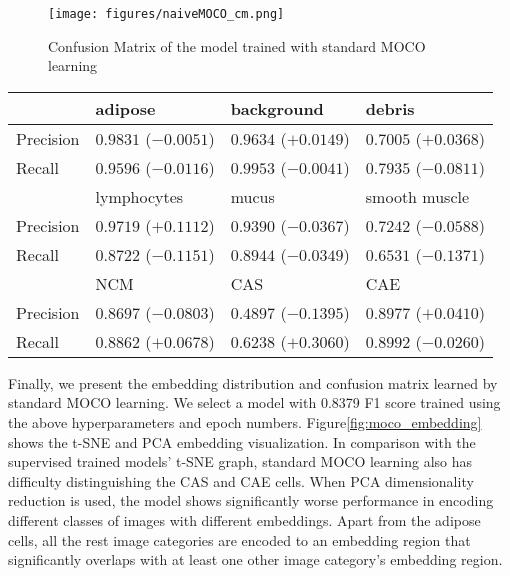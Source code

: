 \documentclass[12pt,twoside]{report}
\begin{document}
\begin{figure}
    \centering
    \texttt{[image: figures/naiveMOCO\_cm.png]}
    \caption{Confusion Matrix of the model trained with standard MOCO learning}
    \label{fig:naiveMOCO_cm}
\end{figure}

\begin{table}[]
    \centering
    \begin{tabular}{llll}
\toprule
 & adipose & background & debris \\
\hline
Precision & $0.9831$ ($-0.0051$) & $0.9634$ ($+0.0149$) & $0.7005$ ($+0.0368$) \\
Recall & $0.9596$ ($-0.0116$) & $0.9953$ ($-0.0041$) & $0.7935$ ($-0.0811$) \\
\toprule
 & lymphocytes & mucus & smooth muscle \\
\hline
Precision & $0.9719$ ($+0.1112$) & $0.9390$ ($-0.0367$) & $0.7242$ ($-0.0588$) \\
Recall & $0.8722$ ($-0.1151$) & $0.8944$ ($-0.0349$) & $0.6531$ ($-0.1371$) \\
\toprule
 & NCM & CAS & CAE \\
\hline
Precision & $0.8697$ ($-0.0803$) & $0.4897$ ($-0.1395$) & $0.8977$ ($+0.0410$) \\
Recall & $0.8862$ ($+0.0678$) & $0.6238$ ($+0.3060$) & $0.8992$ ($-0.0260$) \\
    \bottomrule
    \end{tabular}
    \captionsetup{type=table}
    \label{tab:naiveMOCO_preci_recall}
\end{table}

Finally, we present the embedding distribution and confusion matrix learned by standard MOCO learning. We select a model with 0.8379 F1 score trained using the above hyperparameters and epoch numbers. Figure\ref{fig:moco_embedding} shows the t-SNE and PCA embedding visualization. In comparison with the supervised trained models' t-SNE graph, standard MOCO learning also has difficulty distinguishing the CAS and CAE cells. When PCA dimensionality reduction is used, the model shows significantly worse performance in encoding different classes of images with different embeddings. Apart from the adipose cells, all the rest image categories are encoded to an embedding region that significantly overlaps with at least one other image category's embedding region. \\
\end{document}
